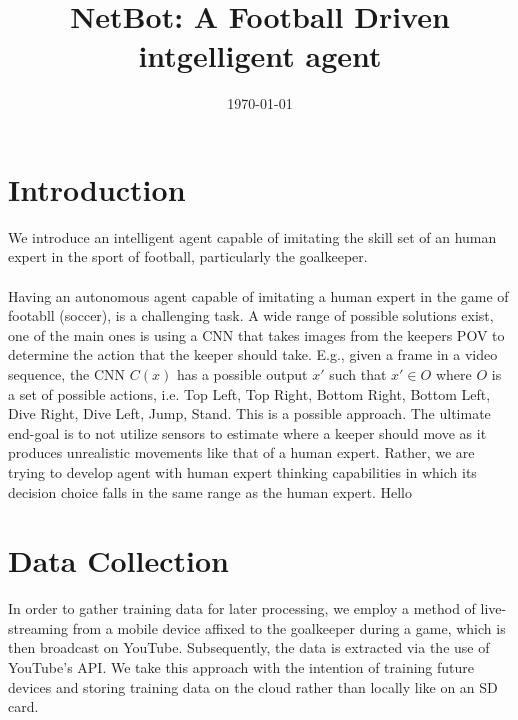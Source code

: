 \documentclass[a4paper]{article}
\title{NetBot: A Football Driven intgelligent agent}
\date{\today}
\begin{document}
\maketitle
\section{Introduction}
We introduce an intelligent agent capable of imitating the skill set of an human expert in the sport of football, particularly the goalkeeper. 
\\ \\

Having an autonomous agent capable of imitating a human expert in the game of footabll (soccer), is a challenging task. A wide range of possible solutions exist, one of the main ones is using a CNN that takes images from the keepers POV to determine the action that the keeper should take. E.g., given a frame in a video sequence, the CNN $C(x)$ has a possible output $x'$ such that $x' \in O$ where $O$ is a set of possible actions, i.e. {Top Left, Top Right, Bottom Right, Bottom Left, Dive Right, Dive Left, Jump, Stand}. This is a possible approach. The ultimate end-goal is to not utilize sensors to estimate where a keeper should move as it produces unrealistic movements like that of a human expert. Rather, we are trying to develop agent with human expert thinking capabilities in which its decision choice falls in the same range as the human expert. Hello

\section{Data Collection}
In order to gather training data for later processing, we employ a method of live-streaming from a mobile device affixed to the goalkeeper during a game, which is then broadcast on YouTube. Subsequently, the data is extracted via the use of YouTube's API. We take this approach with the intention of training future devices and storing training data on the cloud rather than locally like on an SD card. 
\end{document}
